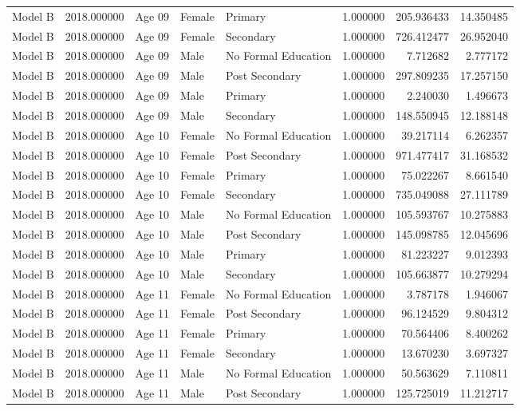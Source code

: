 \begin{table}[ht]
\begin{tabular}{lrlllrrr}
Model B & 2018.000000 & Age 09 & Female & Primary & 1.000000 & 205.936433 & 14.350485 \\
Model B & 2018.000000 & Age 09 & Female & Secondary & 1.000000 & 726.412477 & 26.952040 \\
Model B & 2018.000000 & Age 09 & Male & No Formal Education & 1.000000 & 7.712682 & 2.777172 \\
Model B & 2018.000000 & Age 09 & Male & Post Secondary & 1.000000 & 297.809235 & 17.257150 \\
Model B & 2018.000000 & Age 09 & Male & Primary & 1.000000 & 2.240030 & 1.496673 \\
Model B & 2018.000000 & Age 09 & Male & Secondary & 1.000000 & 148.550945 & 12.188148 \\
Model B & 2018.000000 & Age 10 & Female & No Formal Education & 1.000000 & 39.217114 & 6.262357 \\
Model B & 2018.000000 & Age 10 & Female & Post Secondary & 1.000000 & 971.477417 & 31.168532 \\
Model B & 2018.000000 & Age 10 & Female & Primary & 1.000000 & 75.022267 & 8.661540 \\
Model B & 2018.000000 & Age 10 & Female & Secondary & 1.000000 & 735.049088 & 27.111789 \\
Model B & 2018.000000 & Age 10 & Male & No Formal Education & 1.000000 & 105.593767 & 10.275883 \\
Model B & 2018.000000 & Age 10 & Male & Post Secondary & 1.000000 & 145.098785 & 12.045696 \\
Model B & 2018.000000 & Age 10 & Male & Primary & 1.000000 & 81.223227 & 9.012393 \\
Model B & 2018.000000 & Age 10 & Male & Secondary & 1.000000 & 105.663877 & 10.279294 \\
Model B & 2018.000000 & Age 11 & Female & No Formal Education & 1.000000 & 3.787178 & 1.946067 \\
Model B & 2018.000000 & Age 11 & Female & Post Secondary & 1.000000 & 96.124529 & 9.804312 \\
Model B & 2018.000000 & Age 11 & Female & Primary & 1.000000 & 70.564406 & 8.400262 \\
Model B & 2018.000000 & Age 11 & Female & Secondary & 1.000000 & 13.670230 & 3.697327 \\
Model B & 2018.000000 & Age 11 & Male & No Formal Education & 1.000000 & 50.563629 & 7.110811 \\
Model B & 2018.000000 & Age 11 & Male & Post Secondary & 1.000000 & 125.725019 & 11.212717 \\

\end{tabular}
\end{table}
